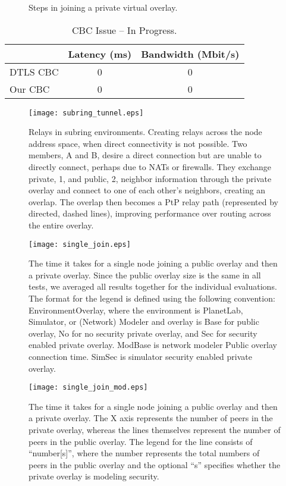 \begin{figure}[ht]
\centering
\caption{Steps in joining a private virtual overlay.}
\label{fig:private_overlay_states}
\end{figure}

\begin{table}[ht]
\centering
\begin{tabular*}{0.75\textwidth}{|l||c|c|} \hline
& Latency (ms) & Bandwidth (Mbit/s) \\ \hline\hline
DTLS CBC & 0 & 0 \\ \hline
Our CBC & 0 & 0 \\ \hline
\end{tabular*}
\caption{CBC Issue -- In Progress.}
\label{tab:cbc_issue}
\end{table}

\begin{figure}[ht]
\centering
\texttt{[image: subring\_tunnel.eps]}
\caption[Relays in subring environments.]{Relays in subring environments.
Creating relays across the node address space, when direct connectivity is not
possible.  Two members, A and B, desire a direct connection but are unable to
directly connect, perhaps due to NATs or firewalls.  They exchange private, 1,
and public, 2, neighbor information through the private overlay and connect to
one of each other's neighbors, creating an overlap.  The overlap then becomes a
PtP relay path (represented by directed, dashed lines), improving performance
over routing across the entire overlay.}
\label{fig:overlay_relay}
\end{figure}

\begin{figure}[ht]
\centering
\texttt{[image: single\_join.eps]}
\caption[Time taken by a single node to join public and private overlays.]{The
time it takes for a single node joining a public overlay and then a private
overlay. Since the public overlay size is the same in all tests, we averaged
all results together for the individual evaluations.  The format for the
legend is defined using the following convention: EnvironmentOverlay, where the
environment is PlanetLab, Simulator, or (Network) Modeler and overlay is Base
for public overlay, No for no security private overlay, and Sec for security
enabled private overlay. ModBase is network modeler Public overlay connection
time.  SimSec is simulator security enabled private overlay.}
\label{fig:single_join}
\end{figure}

\begin{figure}[ht]
\centering
\texttt{[image: single\_join\_mod.eps]}
\caption[Time taken by a single node to join large public and private
overlays.]{The time it takes for a single node joining a public
overlay and then a private overlay. The X axis represents the number of peers
in the private overlay, whereas the lines themselves represent the number of
peers in the public overlay.  The legend for the line consists of
``number[s]'', where the number represents the total numbers of peers in the
public overlay and the optional ``s'' specifies whether the private overlay is
modeling security.}
\label{fig:single_join_mod}
\end{figure}

